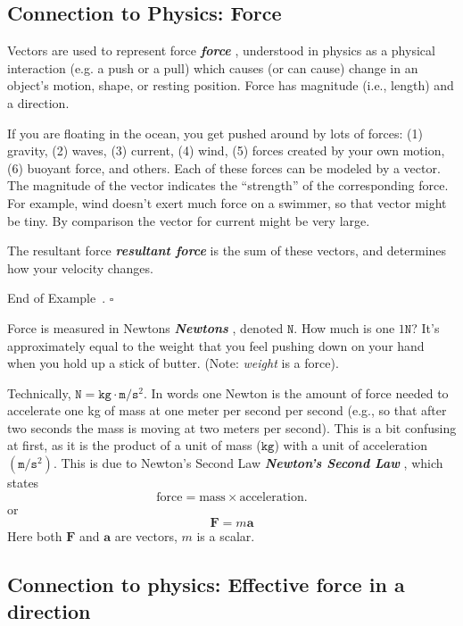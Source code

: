 \documentclass[10pt]{article}
\DeclareRobustCommand{\demph}[1]{%
  \ifmmode
  {\color{Blue}#1}%
  \else
  {\color{Blue}\bfseries\slshape #1}%
  \fi
}
\theoremstyle{definition}
\newtheorem{example}[theorem]{Example}
\renewenvironment{example}
{\begin{oldexample}}
  {\par\smallskip\hfill   End of Example~\theexample. $\square$    \par\end{oldexample}}
\newcommand{\1}[1]{\textbf{1}_{\left[#1\right]}} %
\begin{document}
\subsection{Connection to Physics: Force}
Vectors are used to represent \demph{force}, understood in physics as a
physical interaction (e.g. a push or a pull) which causes (or can cause)
change in an object's motion, shape, or resting position. Force has magnitude
(i.e., length) and a direction.
% 
\begin{example}[Forces]
  If you are floating in the ocean, you get pushed around by lots of forces:
  (1) gravity, (2) waves, (3) current, (4) wind, (5) forces created by your
  own motion, (6) buoyant force, and others. Each of these forces can be
  modeled by a vector. The magnitude of the vector indicates the ``strength''
  of the corresponding force. For example, wind doesn't exert much force on a
  swimmer, so that vector might be tiny. By comparison the vector for current
  might be very large.

  The \demph{resultant force} is the sum of these vectors, and determines how
  your velocity changes.
\end{example}

Force is measured in \demph{Newtons}, denoted $\mathtt{N}$. How much is one $1\mathtt{N}$? It's
approximately equal to the weight that you feel pushing down on your hand when
you hold up a stick of butter. (Note: \textit{weight} is a force).

Technically, $\mathtt{N}=\mathtt{kg}\cdot \mathtt{m}/\mathtt{s}^{2}$. In words one Newton is the
amount of force needed to accelerate one \textrm{kg} of mass at one meter per
second per second (e.g., so that after two seconds the mass is moving at two
meters per second). This is a bit confusing at first, as it is the product of
a unit of mass ($\mathtt{kg}$) with a unit of acceleration $(\mathtt{m}/\mathtt{s}^{2})$.
This is due to \demph{Newton's Second Law}, which states
\begin{equation*}
  \text{force} = \text{mass}\times \text{acceleration}.
\end{equation*}
or
\begin{equation*}
  \mathbf{F} = m\mathbf{a}
\end{equation*}
Here both $\mathbf{F}$ and $\mathbf{a}$ are vectors, $m$ is a scalar.


\subsection{Connection to physics: Effective force in a direction}
\end{document}
